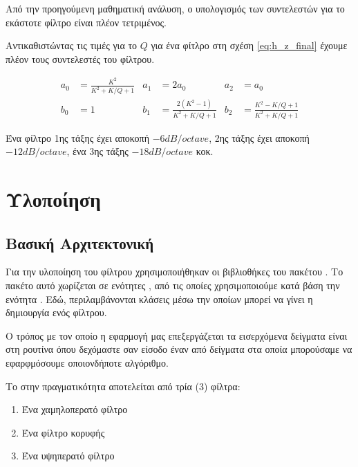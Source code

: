 \documentclass[12pt]{extarticle}
\begin{document}
Από την προηγούμενη μαθηματική ανάλυση, ο υπολογισμός των συντελεστών για το εκάστοτε φίλτρο είναι πλέον 
τετριμένος. 

Αντικαθιστώντας τις τιμές για το $Q$ για ένα φίτλρο  στη σχέση \ref{eq:h_z_final}
έχουμε πλέον τους συντελεστές του φίλτρου. 


\begin{align}
    a_0 &= \frac{K^2}{K^2 + K/Q +1} & a_1 &= 2a_0 & a_2 &= a_0 \\
    b_0 &= 1 & b_1 &= \frac{2(K^2 - 1)}{K^2 + K/Q + 1} & b_2 &= \frac{K^2 - K/Q + 1}{K^2 + K/Q + 1}
\end{align}

Ένα φίλτρο  1ης τάξης έχει αποκοπή $-6dB/octave$, 2ης τάξης έχει αποκοπή $-12dB/octave$, ένα 3ης τάξης $-18dB/octave$ κοκ.

\section{Υλοποίηση}

\subsection{Βασική Αρχιτεκτονική}

Για την υλοποίηση του φίλτρου χρησιμοποιήθηκαν οι βιβλιοθήκες του πακέτου 
. Το πακέτο αυτό χωρίζεται σε ενότητες , από τις οποίες
χρησιμοποιούμε κατά βάση την ενότητα . 
Εδώ, περιλαμβάνονται κλάσεις μέσω την οποίων μπορεί να γίνει η δημιουργία 
ενός φίλτρου.

Ο τρόπος με τον οποίο η εφαρμογή μας επεξεργάζεται τα εισερχόμενα δείγματα
 είναι στη ρουτίνα  όπου δεχόμαστε σαν είσοδο έναν
 από δείγματα στα οποία μπορούσαμε να εφαρφμόσουμε οποιονδήποτε αλγόριθμο. 

Το  στην πραγματικότητα αποτελείται από τρία (3) φίλτρα: 

\begin{enumerate}
    \item Ένα χαμηλοπερατό φίλτρο 
    \item Ένα φίλτρο κορυφής
    \item Ένα υψηπερατό φίλτρο
\end{enumerate}
\end{document}
